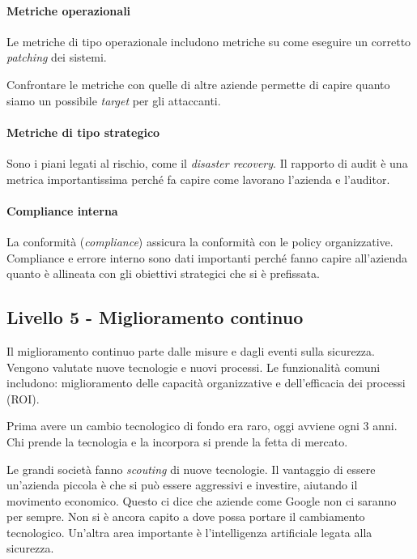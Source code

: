 \paragraph*{Metriche operazionali}

Le metriche di tipo operazionale includono metriche su come eseguire
un corretto \textit{patching} dei sistemi.

Confrontare le metriche con quelle di altre aziende permette di capire quanto
siamo un possibile \textit{target} per gli attaccanti.

\paragraph*{Metriche di tipo strategico}

Sono i piani legati al rischio, come il \textit{disaster recovery}.
Il rapporto di audit è una metrica importantissima perché fa capire come 
lavorano l'azienda e l'auditor.

\paragraph*{Compliance interna}

La conformità (\textit{compliance}) assicura la conformità con le policy 
organizzative. Compliance e errore interno sono dati importanti perché 
fanno capire all'azienda quanto è allineata con gli obiettivi strategici che 
si è prefissata.


\subsection{Livello 5 - Miglioramento continuo}

Il miglioramento continuo parte dalle misure e dagli eventi sulla sicurezza.
Vengono valutate nuove tecnologie e nuovi processi. Le funzionalità comuni
includono: miglioramento delle capacità organizzative e dell'efficacia dei
processi (ROI).

Prima avere un cambio tecnologico di fondo era raro, oggi avviene ogni 3 anni. 
Chi prende la tecnologia e la incorpora si prende la fetta di mercato.

Le grandi società fanno \textit{scouting} di nuove tecnologie. Il vantaggio di
essere un'azienda piccola è che si può essere aggressivi e investire, aiutando
il movimento economico. Questo ci dice che aziende come Google non ci
saranno per sempre. Non si è ancora capito a dove possa portare il cambiamento
tecnologico. Un'altra area importante è l'intelligenza artificiale legata
alla sicurezza.



